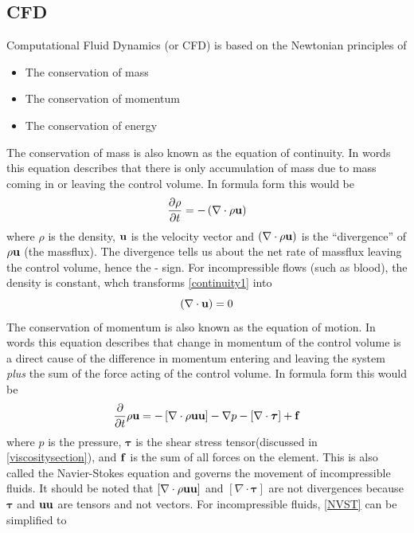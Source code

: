 \subsection{CFD}
Computational Fluid Dynamics (or CFD) is based on the Newtonian principles of
\begin{itemize}
\item The conservation of mass
\item The conservation of momentum
\item The conservation of energy
\end{itemize}
The conservation of mass is also known as the equation of continuity. In words this equation describes that there is only accumulation of mass due to mass coming in or leaving the control volume. In formula form this would be
\begin{equation}
\label{continuity1}
\frac{\partial \rho}{\partial t} = -\left(\nabla \cdot \rho{\bf u}\right)
\end{equation}
where $\rho$ is the density, ${\bf u}$ is the velocity vector and $\left(\nabla \cdot \rho{\bf u}\right)$ is the ``divergence'' of $\rho{\bf u}$ (the massflux). The divergence tells us about the net rate of massflux leaving the control volume, hence the - sign. For incompressible flows (such as blood\cite{merill}), the density is constant, whch transforms \autoref{continuity1} into
\begin{equation}
\left(\nabla\cdot{\bf u}\right) = 0
\end{equation}
The conservation of momentum is also known as the equation of motion. In words this equation describes that change in momentum of the control volume is a direct cause of the difference in momentum entering and leaving the system \emph{plus} the sum of the force acting of the control volume. In formula form this would be
\begin{equation}
\label{NVST}
\frac{\partial}{\partial t}\rho{\bf u} = -\left[\nabla \cdot \rho{\bf uu}\right] -\nabla p -\left[\nabla \cdot {\bm \tau} \right] + {\bf f}
\end{equation}
where $p$ is the pressure, $\bm \tau$ is the shear stress tensor(discussed in \autoref{viscositysection}), and $\bf f$ is the sum of all forces on the element. This is also called the Navier-Stokes equation and governs the movement of incompressible fluids. It should be noted that $\left[\nabla \cdot \rho{\bf uu}\right]$ and $\left[\nabla \cdot {\bm\tau} \right]$ are not divergences because $\bm \tau$ and $\bf uu$ are tensors and not vectors. For incompressible fluids, \autoref{NVST} can be simplified to 
